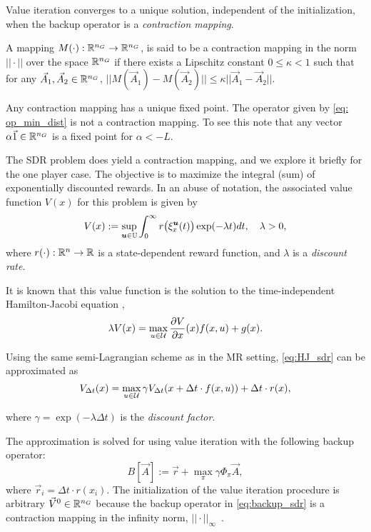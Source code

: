 Value iteration converges to a unique solution, independent of the initialization, when the backup operator is a \emph{contraction mapping}.  
%
\begin{definition} A mapping $M(\cdot): \mathbb{R}^{n_G} \rightarrow \mathbb{R}^{n_G}$, is said to be a contraction mapping in the norm $|| \cdot ||$ over the space $\mathbb{R}^{n_G}$ if there exists a Lipschitz constant $0\leq \kappa < 1$ such that for any $\vec{A}_1, \vec{A}_2 \in \mathbb{R}^{n_G}$, $||M(\vec{A}_1) - M(\vec{A}_2)|| \leq \kappa ||\vec{A}_1 - \vec{A}_2||$. 
\end{definition}

Any contraction mapping has a unique fixed point. The operator given by \eqref{eq: op_min_dist} is not a contraction mapping. To see this note that any vector $\alpha \vec{1} \in \mathbb{R}^{n_G}$ is a fixed point for $\alpha < -L$.

The SDR problem does yield a contraction mapping, and we explore it briefly for the one player case. The objective is to maximize the integral (sum) of exponentially discounted rewards. In an abuse of notation, the associated value function $V(x)$ for this problem is given by
%
\begin{equation}\label{eq:V_sum_rewards}
V(x) := \sup_{\bm{u} \in \mathbb{U}} \int_{0}^{\infty}r\big(\xi_{x}^{\bm{u}}(t)\big)\exp(-\lambda t) dt,  \quad \lambda >0,
\end{equation}%
\noindent where $r(\cdot):\mathbb{R}^n \rightarrow \mathbb{R}$ is a state-dependent reward function, and $\lambda$ is a \emph{discount rate}.

It is known that this value function is the solution to the time-independent Hamilton-Jacobi equation \cite{Bardi2008},
%
\begin{equation} \label{eq:HJ_sdr}
\lambda V(x) = \max_{u\in\mathcal{U}} \frac{\partial V}{\partial x}(x) f(x, u)+ g(x).
\end{equation}

Using the same semi-Lagrangian scheme as in the MR setting, \eqref{eq:HJ_sdr} can be approximated as
%
\begin{equation}
V_{\Delta t}(x) = \max_{u\in\mathcal{U}} \gamma V_{\Delta t}(x + \Delta t\cdot f(x, u))  + \Delta t \cdot r(x),
\end{equation}
 
\noindent where $\gamma=\exp(-\lambda \Delta t)$ is the \emph{discount factor}.

The approximation is solved for using value iteration with the following backup operator:
%
\begin{equation} \label{eq:backup_sdr}
B[\vec{A}] := \vec{r} +  \underset{\pi}{\max} \gamma \Phi_{\pi} \vec{A},
\end{equation}%
\noindent where $\vec{r}_i =\Delta t \cdot r(x_i)$. The initialization of the value iteration procedure is arbitrary $\vec{V}^{0} \in \mathbb{R}^{n_G}$ because the backup  operator in \eqref{eq:backup_sdr} is a contraction mapping in the infinity norm, $||\cdot||_\infty$~\cite{Bertsekas1995}.

